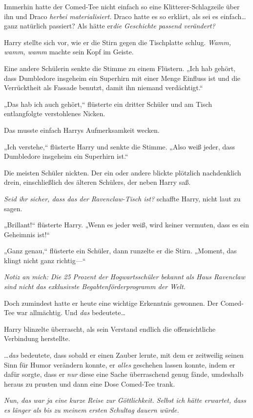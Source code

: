 {Immerhin hatte der Comed-Tee nicht einfach so eine Klitterer-Schlagzeile über ihn und Draco \emph{herbei materialisiert.} Draco hatte es so erklärt, als sei es einfach… ganz natürlich passiert? Als hätte er\emph{die Geschichte passend verändert?}

Harry stellte sich vor, wie er die Stirn gegen die Tischplatte schlug. \emph{Wamm, wamm, wamm} machte sein Kopf im Geiste.

Eine andere Schülerin senkte die Stimme zu einem Flüstern. „Ich hab gehört, dass Dumbledore insgeheim ein Superhirn mit einer Menge Einfluss ist und die Verrücktheit als Fassade benutzt, damit ihn niemand verdächtigt.“

„Das hab ich auch gehört,“ flüsterte ein dritter Schüler und am Tisch entlangfolgte verstohlenes Nicken.

Das musste einfach Harrys Aufmerksamkeit wecken.

„Ich verstehe,“ flüsterte Harry und senkte die Stimme. „Also weiß jeder, dass Dumbledore insgeheim ein Superhirn ist.“

Die meisten Schüler nickten. Der ein oder andere blickte plötzlich nachdenklich drein, einschließlich des älteren Schülers, der neben Harry saß.

\emph{Seid ihr sicher, dass das der Ravenclaw-Tisch ist?} schaffte Harry, nicht laut zu sagen.

„Brillant!“ flüsterte Harry. „Wenn es jeder weiß, wird keiner vermuten, dass es ein Geheimnis ist!“

„Ganz genau,“ flüsterte ein Schüler, dann runzelte er die Stirn. „Moment, das klingt nicht ganz richtig—“

\emph{Notiz an mich: Die 25 Prozent der Hogwartsschüler bekannt als Haus Ravenclaw sind nicht das exklusivste Begabtenförderprogramm der Welt.}

Doch zumindest hatte er heute eine wichtige Erkenntnis gewonnen. Der Comed-Tee war allmächtig. Und \emph{das} bedeutete…

Harry blinzelte überrascht, als sein Verstand endlich die offensichtliche Verbindung herstellte.

…\emph{das} bedeutete, dass sobald er einen Zauber lernte, mit dem er zeitweilig seinen Sinn für Humor verändern konnte, er \emph{alles} geschehen lassen konnte, indem er dafür sorgte, dass er \emph{nur} diese eine Sache überraschend genug fände, umdeshalb heraus zu prusten und dann eine Dose Comed-Tee trank.

\emph{Nun, das war ja eine kurze Reise zur Göttlichkeit. Selbst ich hätte erwartet, dass es länger als bis zu meinem ersten Schultag dauern würde.}

}

